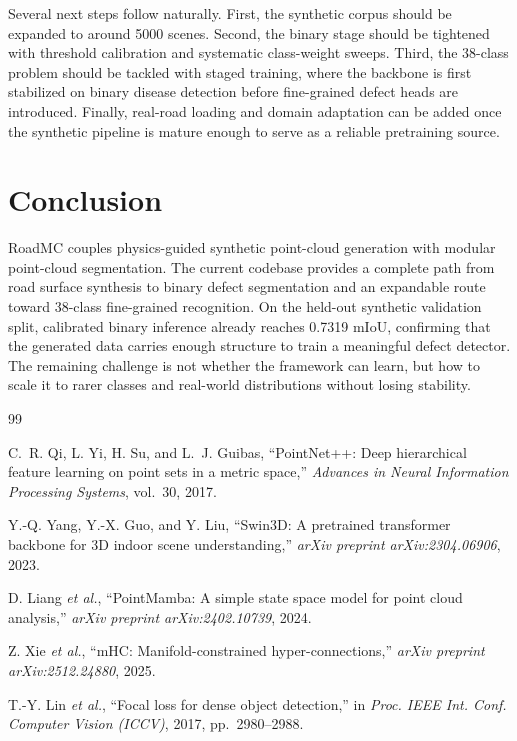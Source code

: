 \documentclass[conference]{IEEEtran}
\begin{document}
Several next steps follow naturally. First, the synthetic corpus should be expanded to around 5000 scenes. Second, the binary stage should be tightened with threshold calibration and systematic class-weight sweeps. Third, the 38-class problem should be tackled with staged training, where the backbone is first stabilized on binary disease detection before fine-grained defect heads are introduced. Finally, real-road loading and domain adaptation can be added once the synthetic pipeline is mature enough to serve as a reliable pretraining source.

\section{Conclusion}
RoadMC couples physics-guided synthetic point-cloud generation with modular point-cloud segmentation. The current codebase provides a complete path from road surface synthesis to binary defect segmentation and an expandable route toward 38-class fine-grained recognition. On the held-out synthetic validation split, calibrated binary inference already reaches 0.7319 mIoU, confirming that the generated data carries enough structure to train a meaningful defect detector. The remaining challenge is not whether the framework can learn, but how to scale it to rarer classes and real-world distributions without losing stability.

\begin{thebibliography}{99}

C.~R. Qi, L. Yi, H. Su, and L.~J. Guibas, ``PointNet++: Deep hierarchical feature learning on point sets in a metric space,'' \emph{Advances in Neural Information Processing Systems}, vol.~30, 2017.

Y.-Q. Yang, Y.-X. Guo, and Y. Liu, ``Swin3D: A pretrained transformer backbone for 3D indoor scene understanding,'' \emph{arXiv preprint arXiv:2304.06906}, 2023.

D. Liang \emph{et al.}, ``PointMamba: A simple state space model for point cloud analysis,'' \emph{arXiv preprint arXiv:2402.10739}, 2024.

Z. Xie \emph{et al.}, ``mHC: Manifold-constrained hyper-connections,'' \emph{arXiv preprint arXiv:2512.24880}, 2025.

T.-Y. Lin \emph{et al.}, ``Focal loss for dense object detection,'' in \emph{Proc. IEEE Int. Conf. Computer Vision (ICCV)}, 2017, pp.~2980--2988.

\end{thebibliography}
\end{document}
